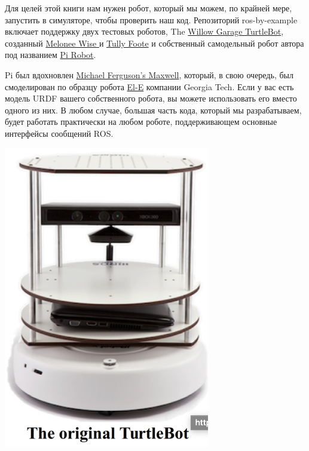 



Для целей этой книги нам нужен робот, который мы можем, по крайней мере, запустить в симуляторе, чтобы проверить наш код. Репозиторий ros-by-example включает поддержку двух тестовых роботов, The \href{http://wiki.ros.org/action/show/Robots/TurtleBot?action=show&redirect=TurtleBot}{Willow Garage TurtleBot}, созданный \href{http://www.meloneewise.com/?page_id=31}{Melonee Wise }и \href{http://www.osrfoundation.org/team/tully-foote/}{Tully Foote} и собственный самодельный робот автора под названием \href{http://www.pirobot.org/}{Pi Robot}. 

Pi был вдохновлен \href{http://www.showusyoursensors.com/}{Michael Ferguson's Maxwell}, который, в свою очередь, был смоделирован по образцу робота \href{http://www.ros.org/news/2010/03/robots-using-ros-georgia-techs-assistive-robots.html}{El-E} компании Georgia Tech. Если у вас есть модель URDF вашего собственного робота, вы можете использовать его вместо одного из них. В любом случае, большая часть кода, который мы разрабатываем, будет работать практически на любом роботе, поддерживающем основные интерфейсы сообщений ROS.

\includegraphics[width=9cm]{.gitbook/assets/snimok-ekrana-2020-05-29-v-21.27.59.png}


